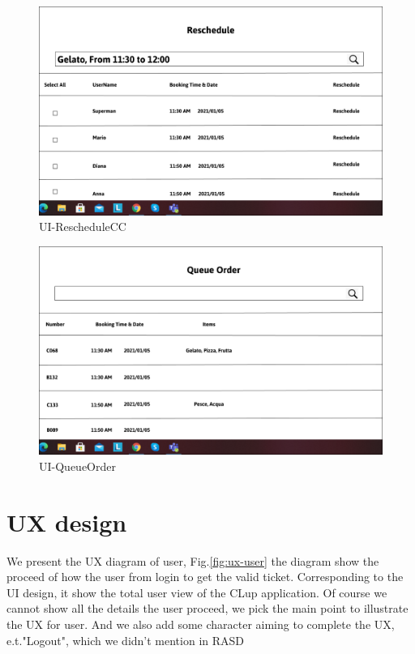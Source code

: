 \documentclass[a4paper,12pt]{report}
\begin{document}
\begin{figure}[H]
	\centering
	\includegraphics[scale=0.4]{UI-RescheduleCC}
	\caption{UI-RescheduleCC}
	\centering
	\label{fig:UI-RescheduleCC}
\end{figure}

\begin{figure}[H]
	\centering
	\includegraphics[scale=0.4]{UI-QueueOrder}
	\caption{UI-QueueOrder}
	\centering
	\label{fig:UI-QueueOrder}
\end{figure}


\section{UX design}
We present the UX diagram of user, Fig.\ref{fig:ux-user} the diagram show the proceed of how the user from login to get the valid ticket. Corresponding to the UI design, it show the total user view of the CLup application. Of course we cannot show all the details the user proceed, we pick the main point to illustrate the UX for user. And we also add some character aiming to complete the UX, e.t."Logout", which we didn't mention in RASD~\\
\end{document}
